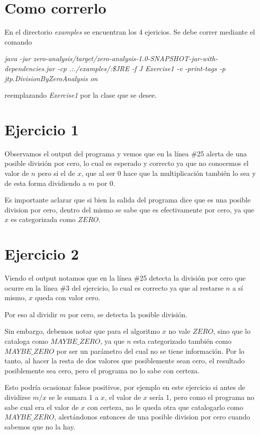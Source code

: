 \section*{Como correrlo}
En el directorio \textit{examples} se encuentran los 4 ejericios. Se debe correr mediante el comando

\textit{java -jar zero-analysis/target/zero-analysis-1.0-SNAPSHOT-jar-with-dependencies.jar -cp .:./examples/:\$JRE -f J Exercise1 -v -print-tags -p jtp.DivisionByZeroAnalysis on}

reemplazando \textit{Exercise1} por la clase que se desee.

\section*{Ejercicio 1}
\setcounter{section}{1}

Observamos el output del programa y vemos que en la línea \#25 alerta de una posible división por cero, lo cual es esperado y correcto ya que no conocemos el valor de $n$ pero si el de $x$, que al ser 0 hace que la multiplicación también lo sea y de esta forma dividiendo a $m$ por 0.

Es importante aclarar que si bien la salida del programa dice que es una posible division por cero, dentro del mismo se sabe que es efectivamente por cero, ya que $x$ es categorizada como $ZERO$.

\section*{Ejercicio 2}
\setcounter{section}{2}

Viendo el output notamos que en la línea \#25 detecta la división por cero que ocurre en la línea \#3 del ejercicio, lo cual es correcto ya que al restarse $n$ a sí mismo, $x$ queda con valor cero.

Por eso al dividir $m$ por cero, se detecta la posible división.

Sin embargo, debemos notar que para el algoritmo $x$ no vale $ZERO$, sino que lo cataloga como $MAYBE\_ZERO$, ya que $n$ esta categorizado también como $MAYBE\_ZERO$ por ser un parámetro del cual no se tiene información. Por lo tanto, al hacer la resta de dos valores que posiblemente sean cero, el resultado posiblemente sea cero, pero el programa no lo sabe con certeza.

Esto podría ocasionar falsos positivos, por ejemplo en este ejercicio si antes de dividirse $m / x$ se le sumara 1 a $x$, el valor de $x$ sería 1, pero como el programa no sabe cual era el valor de $x$ con certeza, no le queda otra que catalogarlo como $MAYBE\_ZERO$, alertándonos entonces de una posible division por cero cuando sabemos que no la hay.

